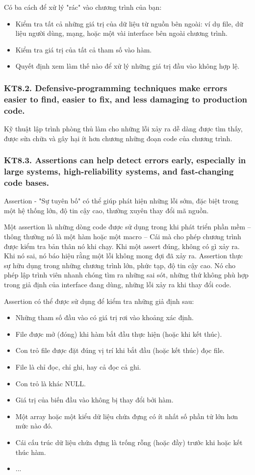 \documentclass[12pt]{report}
\begin{document}
Có ba cách để xử lý "rác" vào chương trình của bạn:
\begin{itemize}
	\item Kiểm tra tất cả những giá trị của dữ liệu từ nguồn bên ngoài: ví dụ file, dữ liệu người dùng, mạng, hoặc một vài interface bên ngoài chương trình. 
	\item Kiểm tra giá trị của tất cả tham số vào hàm. 
	\item Quyết định xem làm thế nào để xử lý những giá trị đầu vào không hợp lệ.  
\end{itemize}


\subsubsection{KT8.2. Defensive-programming techniques make errors easier to find, easier to fix, and less damaging to production code.}
Kỹ thuật lập trình phòng thủ làm cho những lỗi xảy ra dễ dàng được tìm thấy, được sửa chữa và gây hại ít hơn chương những đoạn code của chương trình. 

\subsubsection{KT8.3. Assertions can help detect errors early, especially in large systems, high-reliability systems, and fast-changing code bases.}
Assertion - "Sự tuyên bố" có thể giúp phát hiện những lỗi sớm, đặc biệt trong một hệ thống lớn, độ tin cậy cao, thường xuyên thay đổi mã nguồn. 
\vspace*{3mm}

Một assertion là những dòng code được sử dụng trong khi phát triển phần mềm -- 	thông thường nó là một hàm hoặc một macro -- Cái mà cho phép chương trình được kiểm tra bản thân nó khi chạy. Khi một assert đúng, không có gì xảy ra. Khi nó sai, nó báo hiệu rằng một lỗi không mong đợi đã xảy ra. Assertion thực sự hữu dụng trong những chương trình lớn, phức tạp, độ tin cậy cao. Nó cho phép lập trình viên nhanh chóng tìm ra những sai sót, những thứ không phù hợp trong giả định của interface đang dùng, những lỗi xảy ra khi thay đổi code. 

Assertion có thể được sử dụng để kiểm tra những giả định sau: 
\begin{itemize}
	\item Những tham số đầu vào có giá trị rơi vào khoảng xác định.
	\item File được mở (đóng) khi hàm bắt đầu thực hiện (hoặc khi kết thúc). 
	\item Con trỏ file được đặt đúng vị trí khi bắt đầu (hoặc kết thúc) đọc file. 
	\item File là chỉ đọc, chỉ ghi, hay cả đọc cả ghi. 
	\item Con trỏ là khác NULL.
	\item Giá trị của biến đầu vào không bị thay đổi bởi hàm. 
	\item Một array hoặc một kiểu dữ liệu chứa đựng có ít nhất số phần tử lớn hơn mức nào đó. 
	\item Cái cấu trúc dữ liệu chứa đựng là trống rỗng (hoặc đầy) trước khi hoặc kết thúc hàm.
	\item ...
\end{itemize}
\end{document}
